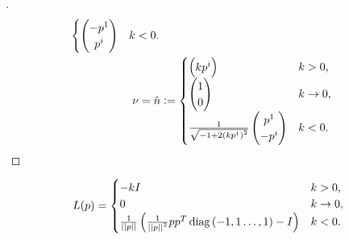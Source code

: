 \documentclass[stu, babel, american, biblatex, a4paper, leqno, draftall]{apa7}
\begin{document}
\begin{proof}[]
\begin{align*}
\begin{cases}
\begin{pmatrix}
                  -\tensor{p}{^1} \\
                  \tensor{p}{^i} \\
              \end{pmatrix} & \text{$k<0$.} \\
            \end{cases} \\
            \nu=\hat{n}
            &\defeq
              \begin{cases}
               \begin{pmatrix}
                   k\tensor{p}{^i} \\
               \end{pmatrix} & \text{$k>0$,} \\
               \begin{pmatrix}
                   1 \\
                   0 \\
               \end{pmatrix} & \text{$k\to 0$,} \\
               \frac{1}{\sqrt{-1+2\left(k\tensor{p}{^1}\right)^2}}
               \begin{pmatrix}
                   \tensor{p}{^1} \\
                   -\tensor{p}{^i} \\
               \end{pmatrix} & \text{$k<0$.} \\
             \end{cases} \qedhere
    \end{align*}
\end{proof}
\begin{lemma}\label{M:ShapeOperator}
    \begin{equation*}
        L(p) = \begin{cases}
            -k I & \text{$k>0$,} \\
            0 & \text{$k\to0$,} \\
            \frac{1}{\left|\left|{p}\right|\right|} \left(\frac{1}{\left|\left|{p}\right|\right|^2} p p^T \operatorname{diag}{\left(-1,1\dots,1\right)} - I\right) & \text{$k<0$.} \\
        \end{cases}
    \end{equation*}
\end{lemma}
\end{document}
